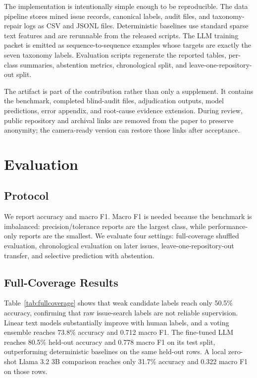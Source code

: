 \documentclass[sigplan,10pt]{acmart}
\begin{document}
The implementation is intentionally simple enough to be reproducible. The data
pipeline stores mined issue records, canonical labels, audit files, and
taxonomy-repair logs as CSV and JSONL files. Deterministic baselines use
standard sparse text features and are rerunnable from the released scripts. The
LLM training packet is emitted as sequence-to-sequence examples whose targets
are exactly the seven taxonomy labels. Evaluation scripts regenerate the
reported tables, per-class summaries, abstention metrics, chronological split,
and leave-one-repository-out split.

The artifact is part of the contribution rather than only a supplement. It
contains the benchmark, completed blind-audit files, adjudication outputs,
model predictions, error appendix, and root-cause evidence extension. During
review, public repository and archival links are removed from the paper to
preserve anonymity; the camera-ready version can restore those links after
acceptance.

\section{Evaluation}

\subsection{Protocol}

We report accuracy and macro F1. Macro F1 is needed because the benchmark is
imbalanced: precision/tolerance reports are the largest class, while
performance-only reports are the smallest. We evaluate four settings:
full-coverage shuffled evaluation, chronological evaluation on later issues,
leave-one-repository-out transfer, and selective prediction with abstention.

\subsection{Full-Coverage Results}

Table~\ref{tab:fullcoverage} shows that weak candidate labels reach only 50.5\%
accuracy, confirming that raw issue-search labels are not reliable supervision.
Linear text models substantially improve with human labels, and a voting
ensemble reaches 73.8\% accuracy and 0.712 macro F1. The fine-tuned LLM reaches
80.5\% held-out accuracy and 0.778 macro F1 on its test split, outperforming
deterministic baselines on the same held-out rows. A local zero-shot Llama 3.2
3B comparison reaches only 31.7\% accuracy and 0.322 macro F1 on those rows.
\end{document}
